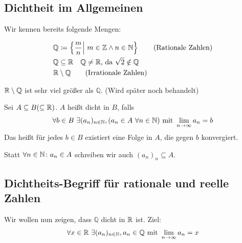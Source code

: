 \subsection{Dichtheit im Allgemeinen}
\thispagestyle{pagenumberonly}

Wir kennen bereits folgende Mengen:

\begin{align*}
    \mathbb{Q}&\coloneqq\left\{\frac{m}{n}\middle|~m\in\mathbb{Z} \land n\in\mathbb{N}\right\}\tag{Rationale Zahlen}\\
    \mathbb{Q}&\subseteq \mathbb{R}\quad \mathbb{Q}\neq\mathbb{R}\text{, da } \sqrt{2}\notin \mathbb{Q}\\
    \mathbb{R}&\setminus\mathbb{Q} \tag{Irrationale Zahlen}
\end{align*}

\begin{bemerkung}
    $\mathbb{R}\setminus\mathbb{Q}$ ist sehr viel größer als $\mathbb{Q}$. (Wird später noch behandelt)
\end{bemerkung}

\begin{definition} %
    Sei $A\subseteq B (\subseteq \mathbb{R})$. $A$ heißt dicht in $B$, falls
    \begin{align*}
        \forall b\in B~\exists (a_n)_{n\in\mathbb{N}}, (a_n \in A~\forall n\in\mathbb{N})\text{ mit }\lim_{n\rightarrow{}\infty} a_n = b
    \end{align*}
    Das heißt für jedes $b\in B$ existiert eine Folge in $A$, die gegen $b$ konvergiert.
\end{definition}

\begin{notation}
    Statt $\forall n\in\mathbb{N}\colon a_n \in A$ schreiben wir auch $(a_n)_n\subseteq A$.
\end{notation}

\subsection{Dichtheits-Begriff für rationale und reelle Zahlen}
Wir wollen nun zeigen, dass $\mathbb{Q}$ dicht in $\mathbb{R}$ ist. Ziel:
\begin{align*}
    \forall x\in\mathbb{R}~\exists (a_n)_{n\in\mathbb{N}}, a_n\in\mathbb{Q}\text{ mit }\lim_{n\rightarrow{}\infty} a_n =x
\end{align*}


